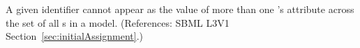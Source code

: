 A given identifier cannot appear as the value of more than one
\InitialAssignment{}'s  attribute across
the set of all \InitialAssignment{}s in a model.  (References:
SBML L3V1 Section~\ref{sec:initialAssignment}.)
